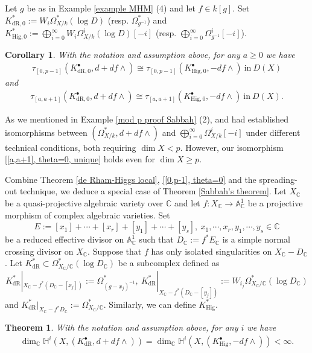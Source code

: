 \documentclass[12pt, a4paper]{article}
\newtheorem{theorem}{Theorem}[section]
\newtheorem{corollary}{Corollary}[section]
\begin{document}
Let $g$ be as in Example \ref{example MHM} (4) and let $f\in k[g]$. Set $K^*_{\mathrm{dR},0}:=W_i\Omega^*_{X/k}(\log D)$ (resp. $\Omega^*_{g^{-1}}$) and $K^*_{\mathrm{Hig},0}:=\bigoplus_{i=0}^\infty W_i\Omega^i_{X/k}(\log D)[-i]$ (resp. $\bigoplus_{i=0}^\infty\Omega^i_{g^{-1}}[-i]$).

\begin{corollary}
 With the notation and assumption above,  for any $a\geq0$ we have
\begin{eqnarray}\label{[0,p-1], theta=0}
\tau_{[0,p-1]}(K^\bullet_{\mathrm{dR},0},d+df\wedge)\cong\tau_{[0,p-1]}(K^\bullet_{\mathrm{Hig},0},-df\wedge)~\mathrm{in}~D(X)
\end{eqnarray}
and
\begin{eqnarray}\label{[a,a+1], theta=0, unique}
\tau_{[a,a+1]}(K^\bullet_{\mathrm{dR},0},d+df\wedge)\cong\tau_{[a,a+1]}(K^\bullet_{\mathrm{Hig},0},-df\wedge)~\mathrm{in}~D(X).
\end{eqnarray}
\end{corollary}
As we mentioned in Example \ref{mod p proof Sabbah} (2), \cite{OV} and \cite{ACH} had established isomorphisms between $(\Omega^*_{X/k},d+df\wedge)$ and $\bigoplus_{i=0}^\infty\Omega^i_{X/k}[-i]$ under different technical conditions, both requiring $\dim X<p$. However, our isomorphism \eqref{[a,a+1], theta=0, unique} holds even for $\dim X\geq p$.

Combine Theorem \ref{de Rham-Higgs local}, \eqref{[0,p-1], theta=0} and the spreading-out technique, we deduce a special case of Theorem \ref{Sabbah's theorem}. Let $X_\mathbb{C}$ be a quasi-projective algebraic variety over $\mathbb C$ and let $f:X_\mathbb{C}\to\mathbb A_\mathbb{C}^1$ be a projective morphism of complex algebraic varieties. Set 
$$E:=[x_1]+\cdots+[x_r]+[y_1]+\cdots+[y_s],~x_1,\cdots,x_r,y_1,\cdots,y_s\in\mathbb C$$ 
be a reduced effective divisor on $\mathbb A^1_\mathbb{C}$ such that $D_\mathbb{C}:=f^*E_\mathbb{C}$ is a simple normal crossing divisor on $X_\mathbb{C}$. Suppose that $f$ has only isolated singularities on $X_\mathbb{C}-D_\mathbb{C}$. Let $K^*_\mathrm{dR}\subset\Omega^*_{X_\mathbb{C}/\mathbb C}(\log D_\mathbb{C})$ be a subcomplex defined as   
$$
K^*_\mathrm{dR}|_{X_\mathbb C-f^*(D_\mathbb C-[x_j])}:=\Omega^*_{(g-x_j)^{-1}},~K^*_\mathrm{dR}|_{X_\mathbb C-f^*(D_\mathbb C-[y_j])}:=W_{i_j}\Omega^*_{X_\mathbb C/\mathbb C}(\log D_\mathbb C)
$$
and $K^*_\mathrm{dR}|_{X_\mathbb C-f^*D_\mathbb C}:=\Omega^*_{X_\mathbb C/\mathbb C}$. Similarly, we can define $K^*_\mathrm{Hig}$.

\begin{theorem}
 With the notation and assumption above, for any $i$ we have
 \begin{eqnarray}\label{E_1 deg Sabbah}
 \dim_\mathbb{C}\mathbb H^i(X,(K^\bullet_\mathrm{dR},d+df\wedge))=\dim_\mathbb{C}\mathbb H^i(X,(K^\bullet_\mathrm{Hig},-df\wedge))<\infty.
 \end{eqnarray}
\end{theorem}
\fi
\iffalse
\end{document}
